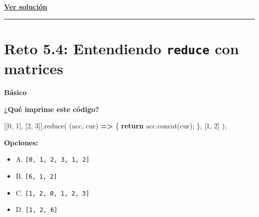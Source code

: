 \documentclass[
  letterpaper,
  DIV=11,
  numbers=noendperiod]{scrreprt}
\newenvironment{Shaded}{\begin{snugshade}}{\end{snugshade}}
\newcommand{\ControlFlowTok}[1]{\textcolor[rgb]{0.00,0.23,0.31}{\textbf{#1}}}
\newcommand{\DecValTok}[1]{\textcolor[rgb]{0.68,0.00,0.00}{#1}}
\newcommand{\FunctionTok}[1]{\textcolor[rgb]{0.28,0.35,0.67}{#1}}
\newcommand{\KeywordTok}[1]{\textcolor[rgb]{0.00,0.23,0.31}{\textbf{#1}}}
\newcommand{\NormalTok}[1]{\textcolor[rgb]{0.00,0.23,0.31}{#1}}
\newcommand{\OperatorTok}[1]{\textcolor[rgb]{0.37,0.37,0.37}{#1}}
\providecommand{\tightlist}{%
  \setlength{\itemsep}{0pt}\setlength{\parskip}{0pt}}
\begin{document}
\textbf{\hyperref[sec-sol-cap5-reto3]{Ver solución}}

\begin{center}\rule{0.5\linewidth}{0.5pt}\end{center}

\section{\texorpdfstring{Reto 5.4: Entendiendo \texttt{reduce} con
matrices}{Reto 5.4: Entendiendo reduce con matrices}}\label{sec-cap5-reto4}

\begin{tcolorbox}[enhanced jigsaw, left=2mm, toprule=.15mm, leftrule=.75mm, breakable, colback=white, coltitle=black, bottomtitle=1mm, arc=.35mm, rightrule=.15mm, colframe=quarto-callout-caution-color-frame, opacitybacktitle=0.6, toptitle=1mm, opacityback=0, titlerule=0mm, title=\textcolor{quarto-callout-caution-color}{\faFire}\hspace{0.5em}{Dificultad}, bottomrule=.15mm, colbacktitle=quarto-callout-caution-color!10!white]

\textbf{Básico}

\end{tcolorbox}

\textbf{¿Qué imprime este código?}

\begin{Shaded}
\begin{Highlighting}[]
\NormalTok{[[}\DecValTok{0}\OperatorTok{,} \DecValTok{1}\NormalTok{]}\OperatorTok{,}\NormalTok{ [}\DecValTok{2}\OperatorTok{,} \DecValTok{3}\NormalTok{]]}\OperatorTok{.}\FunctionTok{reduce}\NormalTok{(}
\NormalTok{  (acc}\OperatorTok{,}\NormalTok{ cur) }\KeywordTok{=\textgreater{}}\NormalTok{ \{}
    \ControlFlowTok{return}\NormalTok{ acc}\OperatorTok{.}\FunctionTok{concat}\NormalTok{(cur)}\OperatorTok{;}
\NormalTok{  \}}\OperatorTok{,}
\NormalTok{  [}\DecValTok{1}\OperatorTok{,} \DecValTok{2}\NormalTok{]}
\NormalTok{)}\OperatorTok{;}
\end{Highlighting}
\end{Shaded}

\textbf{Opciones:}

\begin{itemize}
\tightlist
\item
  A. \texttt{{[}0,\ 1,\ 2,\ 3,\ 1,\ 2{]}}
\item
  B. \texttt{{[}6,\ 1,\ 2{]}}
\item
  C. \texttt{{[}1,\ 2,\ 0,\ 1,\ 2,\ 3{]}}
\item
  D. \texttt{{[}1,\ 2,\ 6{]}}
\end{itemize}
\end{document}
